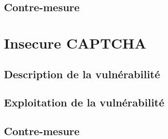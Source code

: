 \subsection{Contre-mesure}

\section{Insecure CAPTCHA}

\subsection{Description de la vulnérabilité}

\subsection{Exploitation de la vulnérabilité}

\subsection{Contre-mesure}








